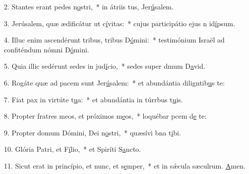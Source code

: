 2. Stantes erant pedes n\uline{o}stri,~* in átriis tus, Jer\uline{ú}salem.\par 
3. Jerúsalem, quæ ædificátur ut c\uline{í}vitas:~* cujus participátio ejus n id\uline{í}psum.\par 
4. Illuc enim ascendérunt tribus, tribus D\uline{ó}mini:~* testimónium Israël ad confiténdum nómni D\uline{ó}mini.\par 
5. Quia illic sedérunt sedes in jud\uline{í}cio,~* sedes super dmum D\uline{a}vid.\par 
6. Rogáte quæ ad pacem sunt Jer\uline{ú}salem:~* et abundántia diligntib\uline{u}s te:\par 
7. Fiat pax in virtúte t\uline{u}a:~* et abundántia in túrrbus t\uline{u}is.\par 
8. Propter fratres meos, et próximos m\uline{e}os,~* loquébar pcem d\uline{e} te:\par 
9. Propter domum Dómini, Dei n\uline{o}stri,~* quæsívi bna t\uline{i}bi.\par 
10. Glória Patri, et F\uline{í}lio,~* et Spiríti S\uline{a}ncto.\par 
11. Sicut erat in princípio, et nunc, et s\uline{e}mper,~* et in sǽcula sæculrum. \uline{A}men.\par 
